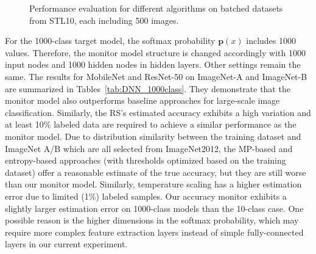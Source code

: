 \documentclass{article}
\newcommand{\cloudModel}{target model\xspace}
\newcommand{\monitorModel}{monitor model\xspace}
\begin{document}
\begin{figure}[!t]
	\centering
	
	\vspace{-0.3cm}
	\caption{Performance evaluation for different algorithms on batched datasets from STL10, each including 500 images. }\label{fig:stream_data}
	\vspace{-0.3cm}
\end{figure}

For the 1000-class \cloudModel, the softmax probability $\mathbf{p}(x)$ includes 1000 values. Therefore, the \monitorModel structure is changed accordingly with 1000 input nodes and 1000 hidden nodes in hidden layers. Other settings remain the same. The results for MobileNet and ResNet-50 on ImageNet-A and ImageNet-B are summarized in Tables~\ref{tab:DNN_1000class}. They demonstrate that the \monitorModel also outperforms baseline approaches for large-scale image classification.
Similarly, the RS's estimated accuracy exhibits a high variation and at least 10\% labeled data are required to achieve a similar performance as the \monitorModel.
Due to distribution similarity
between the training dataset and ImageNet A/B which
are all selected from ImageNet2012, the MP-based
and {entropy-based} approaches (with thresholds optimized
based on the training dataset) offer a reasonable estimate of
the true accuracy, but they are still worse than our monitor model.
Similarly, temperature scaling has a higher estimation error due to limited (1\%) labeled samples.
Our accuracy monitor exhibits a
slightly
larger estimation error on 1000-class models than the 10-class case. One possible reason is the higher dimensions in the softmax probability, which may require more complex feature extraction layers instead of  simple fully-connected layers
in our current experiment.
\end{document}
